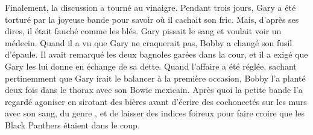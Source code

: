 
Finalement, la discussion a tourné au vinaigre. Pendant trois jours, Gary a été torturé par la joyeuse bande pour savoir où il cachait son fric. Mais, d’après ses dires, il était fauché comme les blés. Gary pissait le sang et voulait voir un médecin. Quand il a vu que Gary ne craquerait pas, Bobby a changé son fusil d’épaule. Il avait remarqué les deux bagnoles garées dans la cour, et il a exigé que Gary les lui donne en échange de sa dette. Quand l’affaire a été réglée, sachant pertinemment que Gary irait le balancer à la première occasion, Bobby l’a planté deux fois dans le thorax avec son Bowie mexicain. Après quoi la petite bande l’a regardé agoniser en sirotant des bières avant d’écrire des cochoncetés sur les murs avec son sang, du genre , et de laisser des indices foireux pour faire croire que les Black Panthers étaient dans le coup.

\illusloflabel{}

